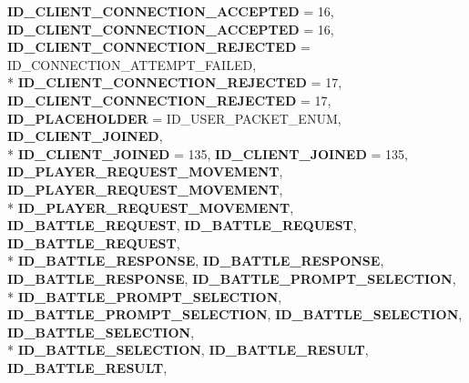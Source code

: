 \begin{DoxyCompactItemize}
{\bfseries I\-D\-\_\-\-C\-L\-I\-E\-N\-T\-\_\-\-C\-O\-N\-N\-E\-C\-T\-I\-O\-N\-\_\-\-A\-C\-C\-E\-P\-T\-E\-D} = 16, 
{\bfseries I\-D\-\_\-\-C\-L\-I\-E\-N\-T\-\_\-\-C\-O\-N\-N\-E\-C\-T\-I\-O\-N\-\_\-\-A\-C\-C\-E\-P\-T\-E\-D} = 16, 
{\bfseries I\-D\-\_\-\-C\-L\-I\-E\-N\-T\-\_\-\-C\-O\-N\-N\-E\-C\-T\-I\-O\-N\-\_\-\-R\-E\-J\-E\-C\-T\-E\-D} = I\-D\-\_\-\-C\-O\-N\-N\-E\-C\-T\-I\-O\-N\-\_\-\-A\-T\-T\-E\-M\-P\-T\-\_\-\-F\-A\-I\-L\-E\-D, 
\\*
{\bfseries I\-D\-\_\-\-C\-L\-I\-E\-N\-T\-\_\-\-C\-O\-N\-N\-E\-C\-T\-I\-O\-N\-\_\-\-R\-E\-J\-E\-C\-T\-E\-D} = 17, 
{\bfseries I\-D\-\_\-\-C\-L\-I\-E\-N\-T\-\_\-\-C\-O\-N\-N\-E\-C\-T\-I\-O\-N\-\_\-\-R\-E\-J\-E\-C\-T\-E\-D} = 17, 
{\bfseries I\-D\-\_\-\-P\-L\-A\-C\-E\-H\-O\-L\-D\-E\-R} = I\-D\-\_\-\-U\-S\-E\-R\-\_\-\-P\-A\-C\-K\-E\-T\-\_\-\-E\-N\-U\-M, 
{\bfseries I\-D\-\_\-\-C\-L\-I\-E\-N\-T\-\_\-\-J\-O\-I\-N\-E\-D}, 
\\*
{\bfseries I\-D\-\_\-\-C\-L\-I\-E\-N\-T\-\_\-\-J\-O\-I\-N\-E\-D} = 135, 
{\bfseries I\-D\-\_\-\-C\-L\-I\-E\-N\-T\-\_\-\-J\-O\-I\-N\-E\-D} = 135, 
{\bfseries I\-D\-\_\-\-P\-L\-A\-Y\-E\-R\-\_\-\-R\-E\-Q\-U\-E\-S\-T\-\_\-\-M\-O\-V\-E\-M\-E\-N\-T}, 
{\bfseries I\-D\-\_\-\-P\-L\-A\-Y\-E\-R\-\_\-\-R\-E\-Q\-U\-E\-S\-T\-\_\-\-M\-O\-V\-E\-M\-E\-N\-T}, 
\\*
{\bfseries I\-D\-\_\-\-P\-L\-A\-Y\-E\-R\-\_\-\-R\-E\-Q\-U\-E\-S\-T\-\_\-\-M\-O\-V\-E\-M\-E\-N\-T}, 
{\bfseries I\-D\-\_\-\-B\-A\-T\-T\-L\-E\-\_\-\-R\-E\-Q\-U\-E\-S\-T}, 
{\bfseries I\-D\-\_\-\-B\-A\-T\-T\-L\-E\-\_\-\-R\-E\-Q\-U\-E\-S\-T}, 
{\bfseries I\-D\-\_\-\-B\-A\-T\-T\-L\-E\-\_\-\-R\-E\-Q\-U\-E\-S\-T}, 
\\*
{\bfseries I\-D\-\_\-\-B\-A\-T\-T\-L\-E\-\_\-\-R\-E\-S\-P\-O\-N\-S\-E}, 
{\bfseries I\-D\-\_\-\-B\-A\-T\-T\-L\-E\-\_\-\-R\-E\-S\-P\-O\-N\-S\-E}, 
{\bfseries I\-D\-\_\-\-B\-A\-T\-T\-L\-E\-\_\-\-R\-E\-S\-P\-O\-N\-S\-E}, 
{\bfseries I\-D\-\_\-\-B\-A\-T\-T\-L\-E\-\_\-\-P\-R\-O\-M\-P\-T\-\_\-\-S\-E\-L\-E\-C\-T\-I\-O\-N}, 
\\*
{\bfseries I\-D\-\_\-\-B\-A\-T\-T\-L\-E\-\_\-\-P\-R\-O\-M\-P\-T\-\_\-\-S\-E\-L\-E\-C\-T\-I\-O\-N}, 
{\bfseries I\-D\-\_\-\-B\-A\-T\-T\-L\-E\-\_\-\-P\-R\-O\-M\-P\-T\-\_\-\-S\-E\-L\-E\-C\-T\-I\-O\-N}, 
{\bfseries I\-D\-\_\-\-B\-A\-T\-T\-L\-E\-\_\-\-S\-E\-L\-E\-C\-T\-I\-O\-N}, 
{\bfseries I\-D\-\_\-\-B\-A\-T\-T\-L\-E\-\_\-\-S\-E\-L\-E\-C\-T\-I\-O\-N}, 
\\*
{\bfseries I\-D\-\_\-\-B\-A\-T\-T\-L\-E\-\_\-\-S\-E\-L\-E\-C\-T\-I\-O\-N}, 
{\bfseries I\-D\-\_\-\-B\-A\-T\-T\-L\-E\-\_\-\-R\-E\-S\-U\-L\-T}, 
{\bfseries I\-D\-\_\-\-B\-A\-T\-T\-L\-E\-\_\-\-R\-E\-S\-U\-L\-T}, 

\end{DoxyCompactItemize}
